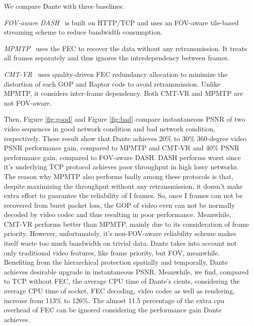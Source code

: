 We compare Dante with three baselines:
\begin{packeditemize}

\item {\em FOV-aware DASH}~\cite{Omnidirectional_Video_over_HTTP} 
is built on HTTP/TCP and uses an FOV-aware tile-based streaming 
scheme to reduce bandwidth consumption.

\item {\em MPMTP}~\cite{MPMTP} uses the FEC to recover the data 
without any retransmission. It treats all frames 
separately and thus ignores the interdependency between frames. 

\item {\em CMT-VR}~\cite{CMT-VR} uses quality-driven FEC 
redundancy allocation to minimize the distortion of each GOP and 
Raptor code to avoid retransmission. Unlike MPMTP, it considers 
inter-frame dependency. Both CMT-VR and MPMTP are not FOV-aware. 

\end{packeditemize}







Then, Figure \ref{fig:good} and Figure \ref{fig:bad} compare instantaneous PSNR of two video sequences in good network condition and bad network condition, respectively. These result show that Dante achieves 20\% to 30\% 360-degree video PSNR performance gain, compared to MPMTP and CMT-VR and 40\% PSNR performance gain, compared to FOV-aware DASH. DASH performs worst since it's underlying TCP protocol achieves poor throughput in high lossy networks. 
The reason why MPMTP also performs badly among these protocols is that, despite maximizing the throughput without any retransmission, it doesn't make extra effort to guarantee the reliability of I frames. So, once I frames can not be recovered from burst packet loss, the GOP of video even can not be normally decoded by video codec and thus resulting in poor performance. Meanwhile, CMT-VR performs better than MPMTP, mainly due to its consideration of frame priority. However, unfortunately, it's non-FOV-aware reliability scheme makes itself waste too much bandwidth on trivial data. Dante takes into account not only traditional video features, like frame priority, but FOV, meanwhile. Benefiting from the hierarchical protection spatially and temporally, Dante achieves desirable upgrade in instantaneous PSNR. Meanwhile, we find, compared to TCP without FEC, the average CPU time of Dante's cients, considering the average CPU time of socket, FEC decoding, video codec as well as rendering, increase from 113\% to 126\%. The almost 11.5 percentage of the extra cpu overhead of FEC can be ignored considering the performance gain Dante achieves.    